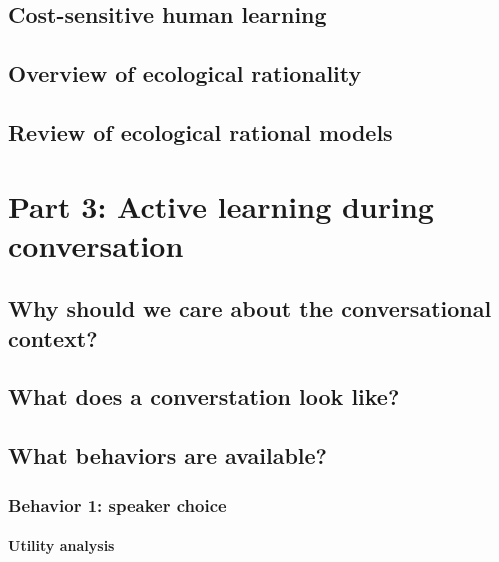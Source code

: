 \documentclass[a4paper,man,apacite,floatsintext]{apa6}
\begin{document}
\subsection{Cost-sensitive human
learning}\label{cost-sensitive-human-learning}

\subsection{Overview of ecological
rationality}\label{overview-of-ecological-rationality}

\subsection{Review of ecological rational
models}\label{review-of-ecological-rational-models}

\section{Part 3: Active learning during
conversation}\label{part-3-active-learning-during-conversation}

\subsection{Why should we care about the conversational
context?}\label{why-should-we-care-about-the-conversational-context}

\subsection{What does a converstation look
like?}\label{what-does-a-converstation-look-like}

\subsection{What behaviors are
available?}\label{what-behaviors-are-available}

\subsubsection{Behavior 1: speaker
choice}\label{behavior-1-speaker-choice}

\paragraph{Utility analysis}\label{utility-analysis}
\end{document}

